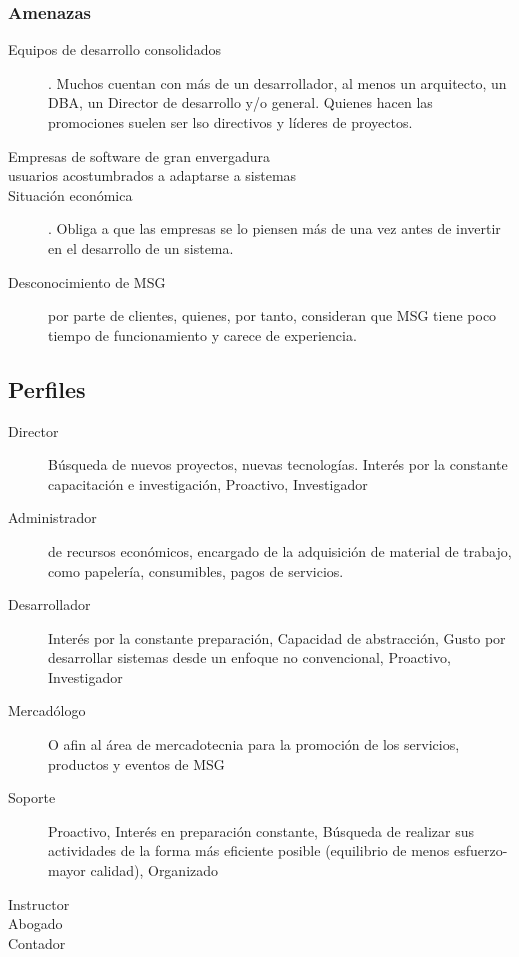 \documentclass[12pt,spanish,lettersize]{article}
\begin{document}
\subsubsection{Amenazas}
\begin{description}
\item[Equipos de desarrollo consolidados]. Muchos cuentan con m\'as de un desarrollador, al menos un arquitecto, un DBA, un Director de desarrollo y/o general. Quienes hacen las promociones suelen ser lso directivos y l\'ideres de proyectos.
\item[Empresas de software de gran envergadura]
\item[usuarios acostumbrados a adaptarse a sistemas]
\item[Situaci\'on econ\'omica]. Obliga a que las empresas se lo piensen m\'as de una vez antes de invertir en el desarrollo de un sistema.
\item[Desconocimiento de MSG] por parte de clientes, quienes, por tanto, consideran que MSG tiene poco tiempo de funcionamiento y carece de experiencia.
\end{description}
\subsection{Perfiles}
\begin{description}
\item[Director] B\'usqueda de nuevos proyectos, nuevas tecnolog\'ias. Inter\'es por la constante capacitaci\'on e investigaci\'on, Proactivo, Investigador
\item[Administrador] de recursos econ\'omicos, encargado de la adquisici\'on de material de trabajo, como papeler\'ia, consumibles, pagos de servicios.
\item[Desarrollador] Inter\'es por la constante preparaci\'on, Capacidad de abstracci\'on, Gusto por desarrollar sistemas desde un enfoque no convencional, Proactivo, Investigador
\item[Mercad\'ologo] O afin al \'area de mercadotecnia para la promoci\'on de los servicios, productos y eventos de MSG
\item[Soporte] Proactivo, Inter\'es en preparaci\'on constante, B\'usqueda de realizar sus actividades de la forma m\'as eficiente posible (equilibrio de menos esfuerzo-mayor calidad), Organizado
\item[Instructor]
\item[Abogado]
\item[Contador]
\end{description}
\end{document}
